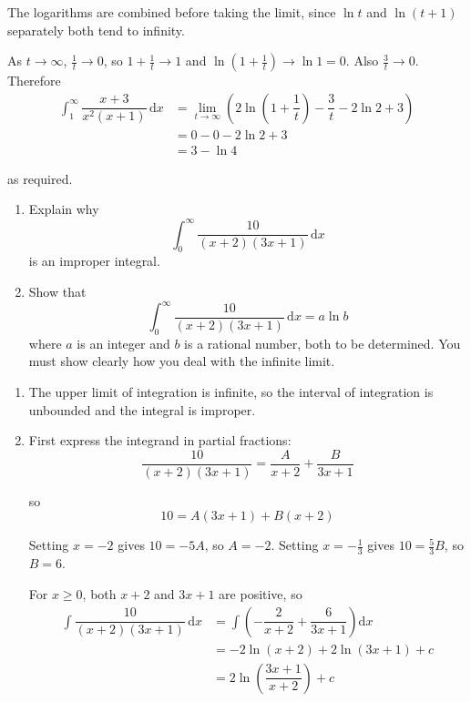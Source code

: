 \documentclass[leqno]{article}
\begin{document}
\begin{enumerate}[
  label=\textbf{\arabic*.},
  leftmargin=*,
  topsep=0pt,
  partopsep=0pt,
  parsep=0pt
]
\begin{djsSolution}
The logarithms are combined before taking the limit, since \(\ln t\) and \(\ln(t+1)\) separately both tend to infinity.

As \(t\to\infty\), \(\frac{1}{t}\to 0\), so \(1+\frac{1}{t}\to 1\) and \(\ln\left(1+\frac{1}{t}\right)\to\ln 1=0\). Also \(\frac{3}{t}\to 0\). Therefore
\begin{align*}
\int_{1}^{\infty} \dfrac{x+3}{x^{2}(x+1)}\,\mathrm{d}x
&=\lim_{t\to\infty}\left(2\ln\left(1+\dfrac{1}{t}\right)-\dfrac{3}{t}-2\ln 2+3\right)\\
&=0-0-2\ln 2+3\\
&=3-\ln 4
\end{align*}

as required.
\end{djsSolution}

\newpage

\questionitem

\begin{enumerate}[label=\textbf{(\alph*)}]
  \item Explain why
  \[\int_{0}^{\infty} \dfrac{10}{(x+2)(3x+1)}\,\mathrm{d}x\]
  is an improper integral.  \\
  \item Show that
  \[\int_{0}^{\infty} \dfrac{10}{(x+2)(3x+1)}\,\mathrm{d}x = a\ln b\]
  where $a$ is an integer and $b$ is a rational number, both to be determined. You must show clearly how you deal with the infinite limit.  \\
\end{enumerate}

\vspace*{10pt}

\begin{djsSolution}
\begin{enumerate}[label=\textbf{(\alph*)}, start=1]
  \item The upper limit of integration is infinite, so the interval of integration is unbounded and the integral is improper.
  \item First express the integrand in partial fractions:
\[
\dfrac{10}{(x+2)(3x+1)}=\dfrac{A}{x+2}+\dfrac{B}{3x+1}
\]

so
\[
10=A(3x+1)+B(x+2)
\]

Setting \(x=-2\) gives \(10=-5A\), so \(A=-2\). Setting \(x=-\frac{1}{3}\) gives \(10=\frac{5}{3}B\), so \(B=6\).

For \(x\ge 0\), both \(x+2\) and \(3x+1\) are positive, so
\begin{align*}
\int \dfrac{10}{(x+2)(3x+1)}\,\mathrm{d}x &= \int\left(-\dfrac{2}{x+2}+\dfrac{6}{3x+1}\right)\mathrm{d}x\\
&=-2\ln(x+2)+2\ln(3x+1)+c\\
&=2\ln\left(\dfrac{3x+1}{x+2}\right)+c
\end{align*}


\end{enumerate}
\end{djsSolution}
\end{enumerate}
\end{document}
